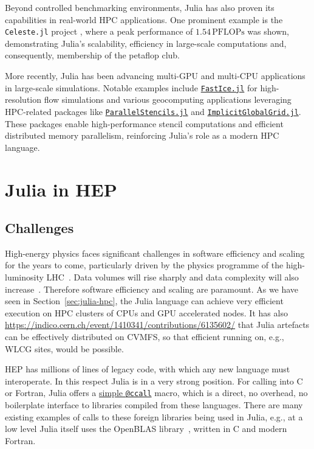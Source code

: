 \documentclass{webofc}
\begin{document}
Beyond controlled benchmarking environments, Julia has also proven its
capabilities in real-world HPC applications. One prominent example is the
\texttt{Celeste.jl} project \cite{RiegerIEEE:2018,RiegerAAS:2019}, where a peak
performance of \(1.54\,\mathrm{PFLOPs}\) was shown, demonstrating Julia's
scalability, efficiency in large-scale computations and, consequently,
membership of the petaflop club.

More recently, Julia has been advancing multi-GPU and multi-CPU applications in
large-scale simulations. Notable examples include
\href{https://github.com/PTsolvers/FastIce.jl}{\texttt{FastIce.jl}} for
high-resolution flow simulations and various geocomputing applications
leveraging HPC-related packages like
\href{https://github.com/omlins/ParallelStencil.jl}{\texttt{ParallelStencils.jl}}
and
\href{https://github.com/eth-cscs/ImplicitGlobalGrid.jl}{\texttt{ImplicitGlobalGrid.jl}}.
These packages enable high-performance stencil computations and efficient
distributed memory parallelism, reinforcing Julia’s role as a modern HPC
language.

\section{Julia in HEP}

\subsection{Challenges}

High-energy physics faces significant challenges in software efficiency and
scaling for the years to come, particularly driven by the physics programme of
the high-luminosity LHC~\cite{hsfcwp}. Data volumes will rise sharply and data
complexity will also
increase~\cite{CERN-LHCC-2022-005,Software:2815292,Valassi2021}. Therefore
software efficiency and scaling are paramount. As we have seen in
Section~\ref{sec:julia-hpc}, the Julia language can achieve very efficient
execution on HPC clusters of CPUs and GPU accelerated nodes. It has also
\href{been shown}{https://indico.cern.ch/event/1410341/contributions/6135602/}
that Julia artefacts can be effectively distributed on CVMFS, so that efficient
running on, e.g., WLCG sites, would be possible.

HEP has millions of lines of legacy code, with which any new language must
interoperate. In this respect Julia is in a very strong position. For calling
into C or Fortran, Julia offers a
\href{https://docs.julialang.org/en/v1/manual/calling-c-and-fortran-code/}{simple
\texttt{@ccall}} macro, which is a direct, no overhead, no boilerplate interface
to libraries compiled from these languages. There are many existing examples of
calls to these foreign libraries being used in Julia, e.g., at a low level Julia
itself uses the OpenBLAS library~\cite{6877458}, written in C and modern
Fortran. 
\end{document}
